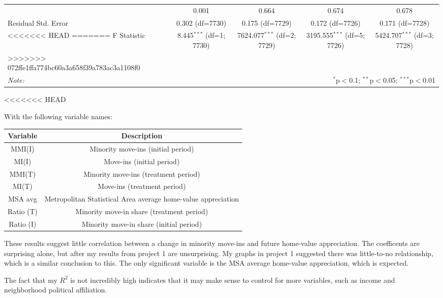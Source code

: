 \documentclass{article}
\begin{document}
\begin{table}[!htbp]
\begin{tabular}{@{\extracolsep{5pt}}lcccc}
\begin{document}
\begin{landscape}
\begin{table}[!htbp]
\begin{tabular}{@{\extracolsep{5pt}}lcccc}
     Adjusted $R^2$ & 0.001 & 0.664 & 0.674 & 0.678 \\
     Residual Std. Error & 0.302 (df=7730) & 0.175 (df=7729) & 0.172 (df=7726) & 0.171 (df=7728) \\
<<<<<<< HEAD
=======
     F Statistic & 8.445$^{***}$ (df=1; 7730) & 7624.077$^{***}$ (df=2; 7729) & 3195.555$^{***}$ (df=5; 7726) & 5424.707$^{***}$ (df=3; 7728) \\
>>>>>>> 072ffe1ffa774bc60a3a658f39a783ac3a1108f0
    \hline
    \hline \\[-1.8ex]
    \textit{Note:} & \multicolumn{4}{r}{$^{*}$p$<$0.1; $^{**}$p$<$0.05; $^{***}$p$<$0.01} \\
    \end{tabular}
<<<<<<< HEAD
\end{table}
\newpage
With the following variable names:

\begin{tabular}{cc}
    Variable & Description \\\hline
    MMI(I) & Minority move-ins (initial period) \\
    MI(I) & Move-ins (initial period) \\
    MMI(T) & Minority move-ins (treatment period) \\
    MI(T) & Move-ins (treatment period) \\
    MSA avg & Metropolitan Statistical Area average home-value appreciation \\
    Ratio (T) & Minority move-in share (treatment period) \\
    Ratio (I) & Minority move-in share (initial period)
\end{tabular}    
These results suggest little correlation between a change in minority move-ins and future home-value appreciation. The coefficents are surprising alone, but after my results from project 1 are unsurprising. My graphs in project 1 suggested there was little-to-no relationship, which is a similar conclusion to this. The only significant variable is the MSA average home-value appreciation, which is expected.

The fact that my $R^2$ is not incredibly high indicates that it may make sense to control for more variables, such as income and neighborhood political affiliation.
\end{document}
